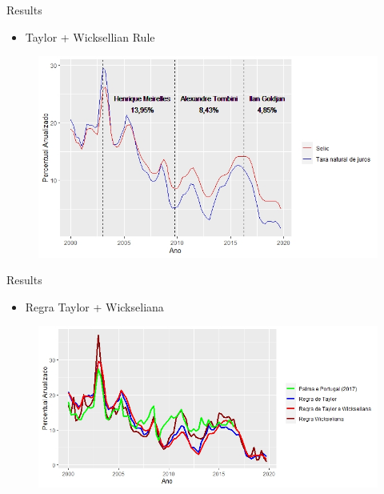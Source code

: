 \documentclass[9pt]{beamer}
\begin{document}
\begin{frame}{Results}
\begin{itemize}
    \item  Taylor + Wicksellian Rule
\end{itemize}
\begin{figure}[H]
\centering
\includegraphics[scale=0.60]{Figuras/ModeloC.jpeg}
\end{figure}

\end{frame}
\begin{frame}{Results}
\begin{itemize}
    \item Regra Taylor + Wickseliana
\end{itemize}
\begin{figure}[H]
\centering
\includegraphics[scale=0.60]{Figuras/Comparativo de Juros.jpeg}
\end{figure}

\end{frame}
\end{document}
